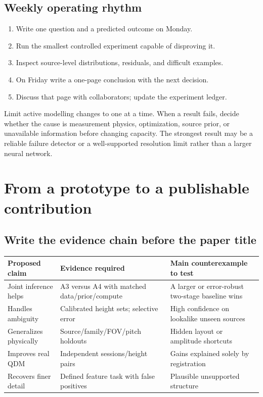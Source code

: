 \subsection{Weekly operating rhythm}
\begin{enumerate}
\item Write one question and a predicted outcome on Monday.
\item Run the smallest controlled experiment capable of disproving it.
\item Inspect source-level distributions, residuals, and difficult examples.
\item On Friday write a one-page conclusion with the next decision.
\item Discuss that page with collaborators; update the experiment ledger.
\end{enumerate}
Limit active modelling changes to one at a time. When a result fails, decide whether the cause is measurement physics, optimization, source prior, or unavailable information before changing capacity. The strongest result may be a reliable failure detector or a well-supported resolution limit rather than a larger neural network.

\section{From a prototype to a publishable contribution}
\label{sec:publication}
\subsection{Write the evidence chain before the paper title}
\begin{tabularx}{\linewidth}{P{35mm}YY}
\toprule Proposed claim & Evidence required & Main counterexample to test\\\midrule
Joint inference helps & A3 versus A4 with matched data/prior/compute & A larger or error-robust two-stage baseline wins\\
Handles ambiguity & Calibrated height sets; selective error & High confidence on lookalike unseen sources\\
Generalizes physically & Source/family/FOV/pitch holdouts & Hidden layout or amplitude shortcuts\\
Improves real QDM & Independent sessions/height pairs & Gains explained solely by registration\\
Recovers finer detail & Defined feature task with false positives & Plausible unsupported structure\\\bottomrule
\end{tabularx}

